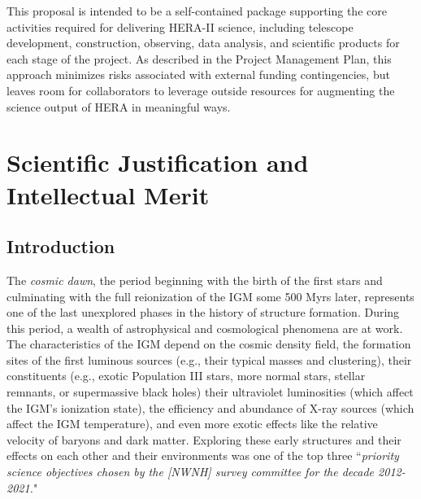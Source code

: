 \documentclass[preprint]{aastex}
\begin{document}
This proposal is intended to be a self-contained package
supporting the core activities required for delivering HERA-II science,
including telescope development, construction, observing, data analysis,
and scientific products for each stage of the project.  As described
in the Project Management Plan, this approach minimizes
risks associated with external funding contingencies, but leaves room for
collaborators to leverage outside resources for augmenting the science
output of HERA in meaningful ways.



\section{Scientific Justification and Intellectual Merit} %

\subsection{Introduction}    %


The {\it cosmic dawn}, the period beginning with the birth of the first stars and culminating with the full
reionization of the IGM some 500 Myrs later, represents one of the last unexplored phases in 
the history of structure formation. During this period, a wealth of astrophysical and cosmological phenomena are at 
work. The characteristics of the IGM depend on the cosmic density field, the formation sites of the 
first luminous sources (e.g., their typical masses and clustering), their constituents (e.g., exotic Population III 
stars, more normal stars, stellar remnants, or supermassive black holes) their ultraviolet luminosities (which affect 
the IGM's ionization state), the efficiency and abundance of X-ray sources (which affect the IGM temperature), and 
even more exotic effects like the relative velocity of baryons and dark matter.  Exploring these early structures and their 
effects on each other and their environments was one of the top three ``{\it priority science objectives chosen by 
the [NWNH] survey committee for the decade 2012-2021.}"
\end{document}
